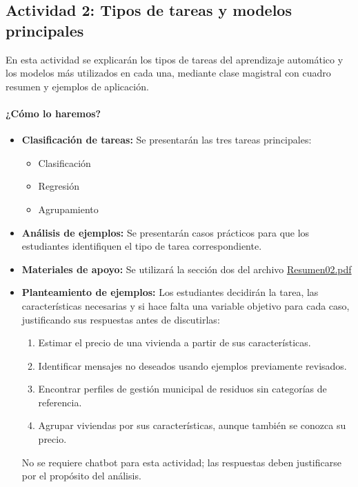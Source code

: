\documentclass[a4,11pt]{aleph-notas}
\begin{document}
\subsection*{Actividad 2: Tipos de tareas y modelos principales}

En esta actividad se explicarán los tipos de tareas del aprendizaje automático y los modelos más utilizados en cada una, mediante clase magistral con cuadro resumen y ejemplos de aplicación.

\paragraph{¿Cómo lo haremos?}
\begin{itemize}[leftmargin=*]
    \item \textbf{Clasificación de tareas:}
    Se presentarán las tres tareas principales:
    \begin{itemize}
        \item {Clasificación}
        \item {Regresión}
        \item {Agrupamiento}
    \end{itemize}
    \item \textbf{Análisis de ejemplos:}
    Se presentarán casos prácticos para que los estudiantes identifiquen el tipo de tarea correspondiente.
    \item \textbf{Materiales de apoyo:}
    Se utilizará la sección dos del archivo \href{https://andres-merino.github.io/AprendizajeAutomaticoInicial-05-N0105/2-Resumenes/Resumen02.pdf}{Resumen02.pdf}
    \item \textbf{Planteamiento de ejemplos:}
    Los estudiantes decidirán la tarea, las características necesarias y si hace falta una variable objetivo para cada caso, justificando sus respuestas antes de discutirlas:
    \begin{enumerate}[leftmargin=*]
        \item Estimar el precio de una vivienda a partir de sus características.
        \item Identificar mensajes no deseados usando ejemplos previamente revisados.
        \item Encontrar perfiles de gestión municipal de residuos sin categorías de referencia.
        \item Agrupar viviendas por sus características, aunque también se conozca su precio.
    \end{enumerate}
    No se requiere chatbot para esta actividad; las respuestas deben justificarse por el propósito del análisis.

\end{itemize}
\end{document}
